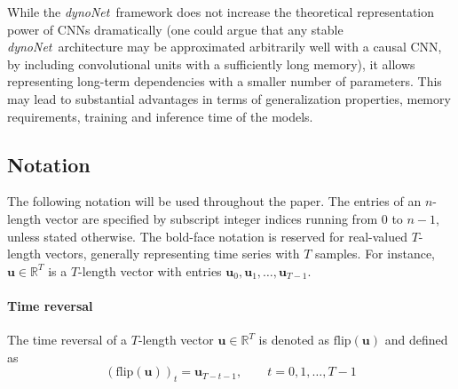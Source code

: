 \documentclass{article}
\newcommand{\R}{\mathbb{R}} %
\newcommand{\tvec}[1]{\mathbf{#1}}
\newcommand{\nsamp}{T}
\newcommand{\Name}{\emph{dynoNet}}
\begin{document}
While the \Name\ framework does not increase the theoretical representation power of CNNs dramatically (one could argue that any stable \Name\ architecture may be approximated arbitrarily well with a causal CNN, by including convolutional units with a sufficiently long memory), it allows representing long-term dependencies with a smaller number of parameters. This 
may lead to substantial advantages in terms of generalization properties, memory requirements, training and inference time of the models.


\subsection{Notation}
The following notation will be used throughout the paper. 
The entries of an $n$-length vector are specified by subscript integer indices running from $0$ to $n\!-\!1$, unless stated otherwise. 
The bold-face notation is reserved for real-valued $\nsamp$-length vectors, generally representing time series with $T$ samples. %
For instance, $\tvec{u} \in \R^{\nsamp}$ is a $T$-length vector with entries $\tvec{u}_0, \tvec{u}_1, \dots, \tvec{u}_{\nsamp -1}$.

\paragraph{Time reversal}
The time reversal of a $\nsamp$-length vector $\tvec{u} \in \R^{\nsamp}$ is denoted as $\textrm{flip}(\tvec{u})$ and defined as
\begin{equation}
\left(\textrm{flip}(\tvec{u})\right)_t = \tvec{u}_{\nsamp-t-1},\qquad t=0,1,\dots,\nsamp-1
\end{equation}
\end{document}
